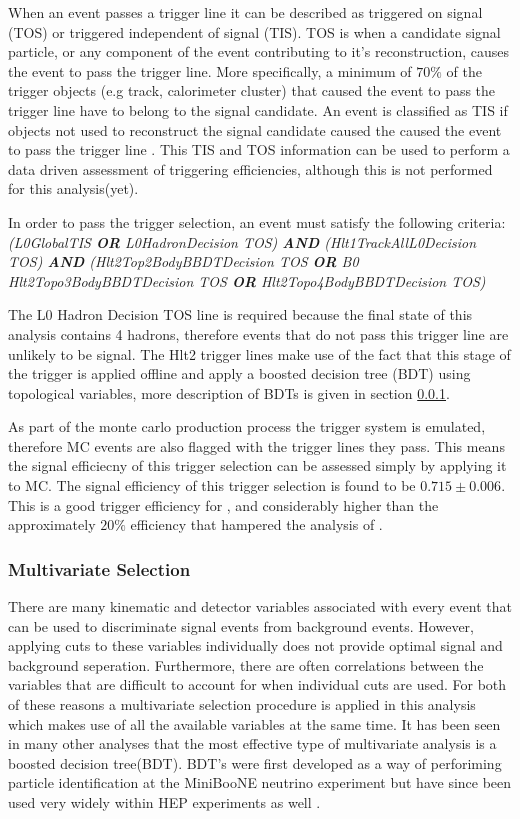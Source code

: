 When an event passes a trigger line it can be described as triggered on signal (TOS) or triggered independent of signal (TIS).  TOS is when a candidate signal particle, or any component of the event contributing to it's reconstruction, causes the event to pass the trigger line.  More specifically, a minimum of $70\%$ of the trigger objects (e.g track, calorimeter cluster) that caused the event to pass the trigger line have to belong to the signal candidate. An event is classified as TIS if objects not used to reconstruct the signal candidate caused the caused the event to pass the trigger line \cite{1748-0221-8-04-P04022}. This TIS and TOS information can be used to perform a data driven assessment of triggering efficiencies, although this is not performed for this analysis(yet)\cite{Tolk:1701134}.

In order to pass the trigger selection, an event must satisfy the following criteria:
\textit{
  (L0GlobalTIS \textbf{OR} L0HadronDecision TOS) \textbf{AND} (Hlt1TrackAllL0Decision TOS) \textbf{AND} (Hlt2Top2BodyBBDTDecision TOS \textbf{OR} B0 Hlt2Topo3BodyBBDTDecision TOS \textbf{OR} Hlt2Topo4BodyBBDTDecision TOS)
}

The L0 Hadron Decision TOS line is required because the final state of this analysis contains 4 hadrons, therefore events that do not pass this trigger line are unlikely to be signal.  The Hlt2 trigger lines make use of the fact that this stage of the trigger is applied offline and apply a boosted decision tree (BDT) using topological variables, more description of BDTs is given in section \ref{sec:multivar}.

As part of the monte carlo production process the \lhcb trigger system is emulated, therefore MC events are also flagged with the trigger lines they pass.  This means the signal efficiecny of this trigger selection can be assessed simply by applying it to MC.  The signal efficiency of this trigger selection is found to be $0.715\pm0.006$.  This is a good trigger efficiency for \lhcb, and considerably higher than the approximately $20\%$ efficiency that hampered the analysis of \Lb \to \Lz\etaz \cite{LHCb-PAPER-2015-019}.

\subsubsection{Multivariate Selection}
\label{sec:multivar}
There are many kinematic and detector variables associated with every event that can be used to discriminate signal events from background events.  However, applying cuts to these variables individually does not provide optimal signal and background seperation.  Furthermore, there are often correlations between the variables that are difficult to account for when individual cuts are used.  For both of these reasons a multivariate selection procedure is applied in this analysis which makes use of all the available variables at the same time.  It has been seen in many other \lhcb analyses that the most effective type of multivariate analysis is a boosted decision tree(BDT).  BDT's were first developed as a way of perforiming particle identification at the MiniBooNE neutrino experiment but have since been used very widely within HEP experiments as well \cite{2005NIMPA.555..370Y}.

